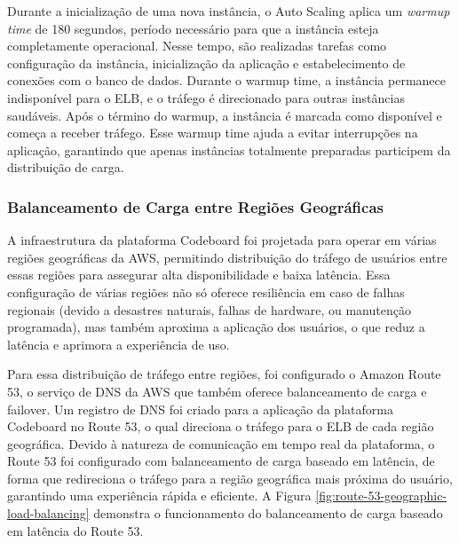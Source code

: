 Durante a inicialização de uma nova instância, o Auto Scaling aplica um \emph{warmup time} de 180 segundos, período necessário para que a instância esteja completamente operacional. Nesse tempo, são realizadas tarefas como configuração da instância, inicialização da aplicação e estabelecimento de conexões com o banco de dados. Durante o warmup time, a instância permanece indisponível para o ELB, e o tráfego é direcionado para outras instâncias saudáveis. Após o término do warmup, a instância é marcada como disponível e começa a receber tráfego. Esse warmup time ajuda a evitar interrupções na aplicação, garantindo que apenas instâncias totalmente preparadas participem da distribuição de carga.


\subsubsection{Balanceamento de Carga entre Regiões Geográficas}

A infraestrutura da plataforma Codeboard foi projetada para operar em várias regiões geográficas da AWS, permitindo distribuição do tráfego de usuários entre essas regiões para assegurar alta disponibilidade e baixa latência. Essa configuração de várias regiões não só oferece resiliência em caso de falhas regionais (devido a desastres naturais, falhas de hardware, ou manutenção programada), mas também aproxima a aplicação dos usuários, o que reduz a latência e aprimora a experiência de uso.

Para essa distribuição de tráfego entre regiões, foi configurado o Amazon Route 53, o serviço de DNS da AWS que também oferece balanceamento de carga e failover. Um registro de DNS foi criado para a aplicação da plataforma Codeboard no Route 53, o qual direciona o tráfego para o ELB de cada região geográfica. Devido à natureza de comunicação em tempo real da plataforma, o Route 53 foi configurado com balanceamento de carga baseado em latência, de forma que redireciona o tráfego para a região geográfica mais próxima do usuário, garantindo uma experiência rápida e eficiente. A Figura \ref{fig:route-53-geographic-load-balancing} demonstra o funcionamento do balanceamento de carga baseado em latência do Route 53.


